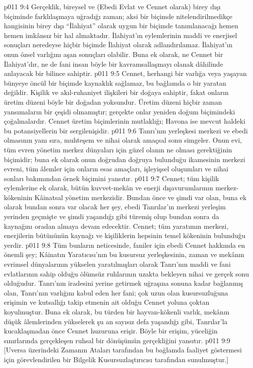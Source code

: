 \vs p011 9:4 Gerçeklik, bireysel ve (Ebedi Evlat ve Cennet olarak) birey dışı biçiminde farklılaşmaya uğradığı zaman; aksi bir biçimde nitelendirilmedikçe hangisinin birey dışı “İlahiyat” olarak uygun bir biçimde tanımlanacağı hemen hemen imkânsız bir hal almaktadır. İlahiyat’ın eylemlerinin maddi ve enerjisel sonuçları neredeyse hiçbir biçimde İlahiyat olarak adlandırılamaz. İlahiyat’ın onun özsel varlığını aşan sonuçları olabilir. Buna ek olarak, ne Cennet bir İlahiyat’dır, ne de fani insan böyle bir kavramsallaşmayı olanak dâhilinde anlayacak bir bilince sahiptir.
\vs p011 9:5 Cennet, herhangi bir varlığa veya yaşayan bünyeye öncül bir biçimde kaynaklık sağlamaz, bu bağlamda o bir yaratan değildir. Kişilik ve akıl\hyp{}ruhaniyet ilişkileri  bir doğaya sahiptir, fakat onların üretim düzeni böyle bir doğadan yoksundur. Üretim düzeni hiçbir zaman yansımaların bir çeşidi olmamıştır; gerçekte onlar yeniden doğum biçimindeki çoğalmalardır. Cennet üretim biçimlerinin mutlaklığı; Havona ise mevcut haldeki bu potansiyellerin bir sergilenişidir.
\vs p011 9:6 Tanrı’nın yerleşkesi merkezi ve ebedi olmasının yanı sıra, muhteşem ve nihai olarak amaçsal sonu simgeler. Onun evi, tüm evren yönetim merkez dünyaları için güzel olanın ne olması gerektiğinin biçimidir; buna ek olarak onun doğrudan doğruya bulunduğu ikamesinin merkezi evreni, tüm âlemler için onların esas amaçları, işleyişsel oluşumları ve nihai sonları bakımından örnek biçimini yansıtır.
\vs p011 9:7 Cennet; tüm kişilik eylemlerine ek olarak, bütün kuvvet\hyp{}mekân ve enerji dışavurumlarının merkez\hyp{}kökeninin Kâinatsal yönetim merkezidir. Bundan önce ve şimdi var olan, buna ek olarak bundan sonra var olacak her şey, ebedi Tanrılar’ın merkezi yerleşim yerinden geçmişte ve şimdi yaşandığı gibi türemiş olup bundan sonra da kaynağını oradan almaya devam edecektir. Cennet; tüm yaratımın merkezi, enerjilerin bütününün kaynağı ve kişiliklerin hepsinin temel kökeninin bulunduğu yerdir.
\vs p011 9:8 Tüm bunların neticesinde, faniler için ebedi Cennet hakkında en önemli şey; Kâinatın Yaratıcısı’nın bu kusursuz yerleşkesinin, zaman ve mekânın evrimsel dünyalarının yükselen yaratılmışları olarak Tanrı’nın maddi ve fani evlatlarının sahip olduğu ölümsüz ruhlarının uzakta bekleyen nihai ve gerçek sonu olduğudur. Tanrı’nın iradesini yerine getirmek uğraşına sonuna kadar bağlanmış olan, Tanrı’nın varlığını kabul eden her fani; çok uzun olan kusursuzluğuna erişimin ve kutsallığı takip etmenin ait olduğu Cennet yoluna çoktan koyulmuştur. Buna ek olarak, bu türden bir hayvan\hyp{}kökenli varlık, mekânın düşük âlemlerinden yükselerek şu an sayısız defa yaşandığı gibi, Tanrılar’la kucaklaşmadan önce Cennet huzuruna erişir. Böyle bir erişim, yüceliğin sınırlarında gerçekleşen ruhsal bir dönüşümün gerçekliğini yansıtır.
\vs p011 9:9 [Uversa üzerindeki Zamanın Ataları tarafından bu bağlamda faaliyet göstermesi için görevlendirilen bir Bilgelik Kusursuzlaştırıcısı tarafından sunulmuştur.]
